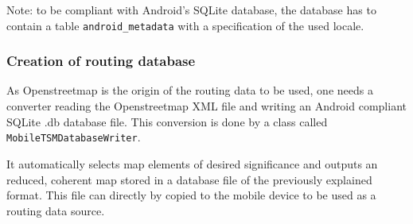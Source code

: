 Note: to be compliant with Android's SQLite database, the database has to contain a table \texttt{android\_metadata} with a specification of the used locale.


\subsubsection{Creation of routing database}

As Openstreetmap is the origin of the routing data to be used, one needs a converter reading the Openstreetmap XML file and writing an Android compliant SQLite .db database file. This conversion is done by a class called \texttt{MobileTSMDatabaseWriter}.\newline

It automatically selects map elements of desired significance and outputs an reduced, coherent map stored in a database file of the previously explained format. This file can directly by copied to the mobile device to be used as a routing data source.